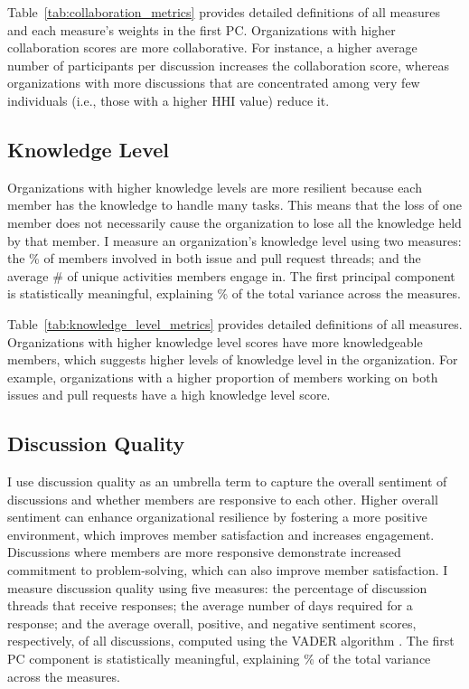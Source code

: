 \documentclass[12pt,notitlepage]{article}
\begin{document}
Table~\ref{tab:collaboration_metrics} provides detailed definitions of all \CollabMeasureCount{} measures and each measure's weights in the first PC.
Organizations with higher collaboration scores are more collaborative. 
For instance, a higher average number of participants per discussion increases the collaboration score, whereas organizations with more discussions that are concentrated among very few individuals (i.e., those with a higher HHI value) reduce it. 

\subsection{Knowledge Level}
Organizations with higher knowledge levels are more resilient because each member has the knowledge to handle many tasks. 
This means that the loss of one member does not necessarily cause the organization to lose all the knowledge held by that member.
I measure an organization's knowledge level using two measures: the \% of members involved in both issue and pull request threads; and the average \# of unique activities members engage in.
The first principal component is statistically meaningful, explaining \KnowledgeVarianceExplained\% of the total variance across the \KnowledgeMeasureCount{} measures.

Table~\ref{tab:knowledge_level_metrics} provides detailed definitions of all \KnowledgeMeasureCount{} measures.
Organizations with higher knowledge level scores have more knowledgeable members, which suggests higher levels of knowledge level in the organization.
For example, organizations with a higher proportion of members working on both issues and pull requests have a high knowledge level score. 

\subsection{Discussion Quality}
I use discussion quality as an umbrella term to capture the overall sentiment of discussions and whether members are responsive to each other. 
Higher overall sentiment can enhance organizational resilience by fostering a more positive environment, which improves member satisfaction and increases engagement. 
Discussions where members are more responsive demonstrate increased commitment to problem-solving, which can also improve member satisfaction.
I measure discussion quality using five measures: the percentage of discussion threads that receive responses; the average number of days required for a response; and the average overall, positive, and negative sentiment scores, respectively, of all discussions, computed using the VADER algorithm \citep{hutto_vader_2014}.
The first PC component is statistically meaningful, explaining \DiscussionVarianceExplained\% of the total variance across the \DiscussionMeasureCount{} measures.
\end{document}
